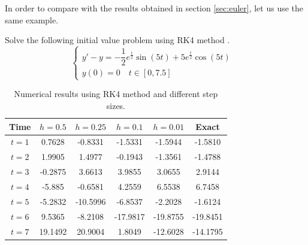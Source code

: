 In order to compare with the results obtained in section \ref{sec:euler}, let us use the same example.
\begin{exmp}
Solve the following initial value problem using RK4 method \cite{exampleeuler}.
\begin{equation}
\begin{cases}
    y'-y=-\dfrac{1}{2}e^{\frac{t}{2}}\sin(5t)+5e^{\frac{t}{2}}\cos(5t)&\\y(0)=0\quad t\in[0,7.5]&
    \end{cases}
\end{equation}\label{eq:ex2kutta}
\end{exmp}

\begin{table}[H]
\centering
\begin{tabular}{cccccc}
\hline
\textbf{Time}           & \textbf{\boldmath$h=0.5$} & \textbf{\boldmath$h=0.25$} & \textbf{\boldmath$h=0.1$} & \textbf{\boldmath$h=0.01$} & \textbf{Exact} \\ \hline
\textbf{\boldmath$t=1$} & 0.7628         & -0.8331         & -1.5331         & -1.5944          & -1.5810        \\
\textbf{\boldmath$t=2$} & 1.9905          & 1.4977           & -0.1943        & -1.3561          & -1.4788        \\
\textbf{\boldmath$t=3$} & -0.2875        & 3.6613           & 3.9855          & 3.0655           & 2.9144         \\
\textbf{\boldmath$t=4$} & -5.885         & -0.6581         & 4.2559          & 6.5538           & 6.7458         \\
\textbf{\boldmath$t=5$} & -5.2832         & -10.5996          & -6.8537         & -2.2028          & -1.6124        \\
\textbf{\boldmath$t=6$} & 9.5365          & -8.2108          & -17.9817         & -19.8755          & -19.8451       \\
\textbf{\boldmath$t=7$} & 19.1492          & 20.9004           & 1.8049          & -12.6028          & -14.1795       \\ \hline
\end{tabular}
\caption{Numerical results using RK4 method and different step sizes.}
\label{tab:ex2kutta}
\end{table}

